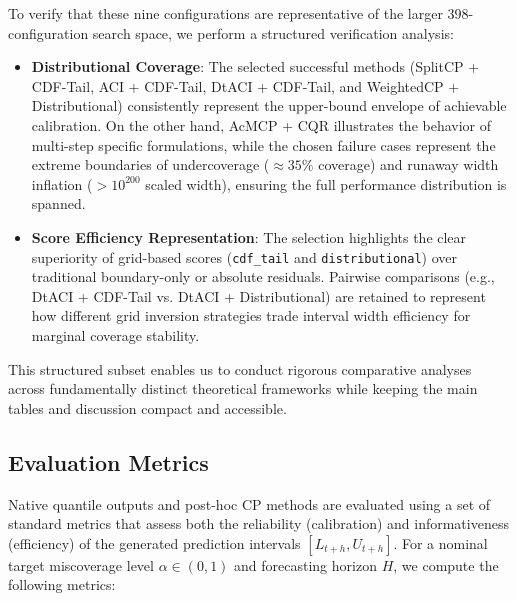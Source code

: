 \documentclass[12pt, a4paper]{article}
\begin{document}
To verify that these nine configurations are representative of the larger \(398\)-configuration search space, we perform a structured verification analysis:
\begin{itemize}
	\item \textbf{Distributional Coverage}: The selected successful methods (SplitCP + CDF-Tail, ACI + CDF-Tail, DtACI + CDF-Tail, and WeightedCP + Distributional) consistently represent the upper-bound envelope of achievable calibration. On the other hand, AcMCP + CQR illustrates the behavior of multi-step specific formulations, while the chosen failure cases represent the extreme boundaries of undercoverage (\(\approx 35\%\) coverage) and runaway width inflation (\(>10^{200}\) scaled width), ensuring the full performance distribution is spanned.
	\item \textbf{Score Efficiency Representation}: The selection highlights the clear superiority of grid-based scores (\texttt{cdf\_tail} and \texttt{distributional}) over traditional boundary-only or absolute residuals. Pairwise comparisons (e.g., DtACI + CDF-Tail vs. DtACI + Distributional) are retained to represent how different grid inversion strategies trade interval width efficiency for marginal coverage stability.
\end{itemize}
This structured subset enables us to conduct rigorous comparative analyses across fundamentally distinct theoretical frameworks while keeping the main tables and discussion compact and accessible.

\subsection{Evaluation Metrics} \label{subsec:metrics}
Native quantile outputs and post-hoc CP methods are evaluated using a set of standard metrics that assess both the reliability (calibration) and informativeness (efficiency) of the generated prediction intervals \([L_{t+h}, U_{t+h}]\). For a nominal target miscoverage level \(\alpha \in (0, 1)\) and forecasting horizon \(H\), we compute the following metrics:
\end{document}
